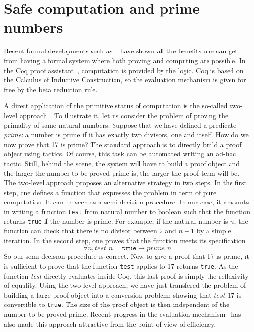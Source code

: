 

\section{Safe computation and prime numbers}

Recent formal developments such as ~\cite{4color,kepler} have shown all the benefits
one can get from having a formal system where both proving and computing are
possible. In the {\sc Coq} proof assistant~\cite{Coq}, computation is
provided by the logic. {\sc Coq} is based on the Calculus of 
Inductive Construction, so the evaluation mechanism is given for free
by the beta reduction rule. 

A direct application of the primitive status of computation is 
the so-called two-level approach~\cite{boutin}. To illustrate it, 
let us consider the problem of proving the primality of some natural 
numbers.
Suppose that we have defined a predicate {\it prime}: a number is prime 
if it has exactly two divisors, one and itself. 
How do we now prove that 17 is prime? The standard approach is to
directly build a proof object using tactics. Of course, this task can be 
automated writing an ad-hoc tactic. Still, behind the scene, the system 
will have to build a proof object and the larger the number to be proved
prime is, the larger the proof term will be.
The two-level approach proposes an alternative
strategy in two steps. In the first step, one defines a function that expresses
the problem in term of pure computation. It can be seen as a semi-decision procedure.
In our case, it amounts in writing a 
function {\tt test} from natural number to boolean such that the function
returns {\tt true} if the number is prime. For example, if the natural number
is $n$, the function can check that there is no divisor between 2 and $n-1$
by a simple iteration. In the second step, one proves that the function meets 
its specification
$$
\forall n, \textit{test}\,\, n = \texttt{true} \rightarrow \textit{prime}\,\, n
$$
So our semi-decision procedure is correct.
Now to give a proof that 17 is prime, it is sufficient to prove that the function
{\tt test} applies to 17 returns {\tt true}. As the function {\it test} directly
evaluates inside {\sc Coq}, this last proof is simply the reflexivity of equality.
Using the two-level approach, we have just transfered the problem of building a 
large proof object into a conversion problem: showing that $test\,\, 17$ is convertible
to {\tt true}.  The size of the proof object is then independent of the number to be proved
prime. Recent progress in the evaluation mechanism~\cite{GreLer} has also made this
approach attractive from the point of view of efficiency.


